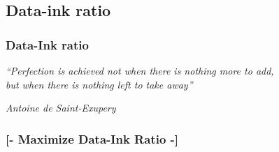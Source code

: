 \documentclass[xcolor=x11names,compress, aspectratio=169]{beamer}
\renewcommand{\(}{\begin{columns}}
\renewcommand{\)}{\end{columns}}
\newcommand{\<}[1]{\begin{column}{#1}}
\renewcommand{\>}{\end{column}}
\begin{document}
\subsection{Data-ink ratio}

\begin{frame} %
\frametitle{Data-Ink ratio}
\begin{center}
\emph{``Perfection is achieved not when there is nothing more to add, \\
but when there is nothing left to take away'' }
\end{center}
\flushright \emph{ Antoine de Saint-Exupery}
\end{frame}



\begin{frame} %
\frametitle{\textcolor{brique}{[- Maximize Data-Ink Ratio -]}}
\begin{center}
\begin{itemize}
\end{itemize}
\end{center}
\end{frame}
\end{document}
